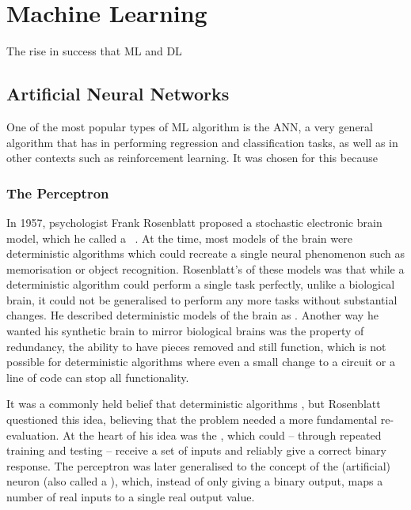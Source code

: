 
\chapter{Machine Learning}

The rise in success that \ac{ML} and \ac{DL} 

\section{Artificial Neural Networks}

One of the most popular types of \ac{ML} algorithm is the \ac{ANN}, a very general algorithm that has  in performing regression and classification tasks, as well as in other contexts such as reinforcement learning.
It was chosen for this   because 

\subsection{The Perceptron}

In 1957, psychologist Frank Rosenblatt proposed a stochastic electronic brain model, which he called a ~\autocite{rosenblatt1957}.
At the time, most models of the brain were deterministic algorithms which could recreate a single neural phenomenon such as memorisation or object recognition.
Rosenblatt's  of these models was that while a deterministic algorithm could perform a single task perfectly, unlike a biological brain, it could not be generalised to perform any more tasks without substantial changes.
He described deterministic models of the brain as .
Another way he wanted his synthetic brain to mirror biological brains was the property of redundancy, the ability to have pieces removed and still function, which is not possible for deterministic algorithms where even a small change to a circuit or a line of code can stop all functionality.

It was a commonly held belief that deterministic algorithms , but Rosenblatt questioned this idea, believing that the problem needed a more fundamental re-evaluation.
At the heart of his idea was the , which could -- through repeated training and testing -- receive a set of inputs and reliably give a correct binary response.
The perceptron was later generalised to the concept of the (artificial) neuron (also called a ), which, instead of only giving a binary output, maps a number of real inputs to a single real output value.

